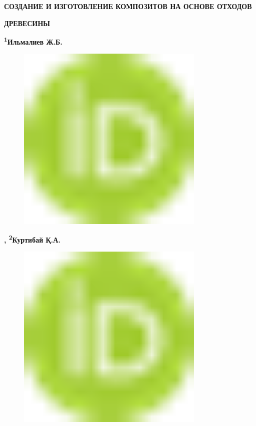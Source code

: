 
{\bfseries СОЗДАНИЕ И ИЗГОТОВЛЕНИЕ КОМПОЗИТОВ НА ОСНОВЕ ОТХОДОВ}

{\bfseries ДРЕВЕСИНЫ}

{\bfseries \textsuperscript{1}Ильмалиев
Ж.Б.}
\begin{figure}[H]
	\centering
	\includegraphics[width=0.8\textwidth]{media/chem2/image1}
	\caption*{}
\end{figure}
{\bfseries ,
\textsuperscript{2}Куртибай
Қ.А.}
\begin{figure}[H]
	\centering
	\includegraphics[width=0.8\textwidth]{media/chem2/image1}
	\caption*{}
\end{figure}

